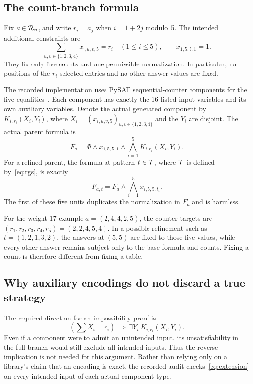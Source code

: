 \subsection{The count-branch formula}
Fix $a\in\mathcal{R}_n$, and write $r_i=a_j$ when $i=1+2j$ modulo~5.
The intended additional constraints are
\begin{equation}\label{eq:cardinality}
\sum_{u,v\in\{1,2,3,4\}}x_{i,u,v,5}=r_i
\quad(1\leq i\leq5),\qquad x_{1,5,5,1}=1.
\end{equation}
They fix only five counts and one permissible normalization. In
particular, no positions of the $r_i$ selected entries and no other answer
values are fixed.

The recorded implementation uses PySAT sequential-counter components
for the five equalities~\cite{pysat}. Each component has exactly the
16 listed input variables and its own auxiliary variables. Denote the
actual generated component by $K_{i,r_i}(X_i,Y_i)$, where
$X_i=(x_{i,u,v,5})_{u,v\in\{1,2,3,4\}}$ and the $Y_i$ are disjoint.
The actual parent formula is
\begin{equation}\label{eq:parent}
F_a=\Phi\land x_{1,5,5,1}\land\bigwedge_{i=1}^5K_{i,r_i}(X_i,Y_i).
\end{equation}
For a refined parent, the formula at pattern $t\in\mathcal{T}$, where $\mathcal{T}$
is defined by~\eqref{eq:rgs}, is exactly
\begin{equation}\label{eq:child}
F_{a,t}=F_a\land\bigwedge_{i=1}^5x_{i,5,5,t_i}.
\end{equation}
The first of these five units duplicates the normalization in $F_a$ and
is harmless.

For the weight-17 example $a=(2,4,4,2,5)$, the counter targets are
$(r_1,r_2,r_3,r_4,r_5)=(2,2,4,5,4)$. In a possible refinement such as
$t=(1,2,1,3,2)$, the answers at $(5,5)$ are fixed to those five values,
while every other answer remains subject only to the base formula and
counts. Fixing a count is therefore different from fixing a table.

\subsection{Why auxiliary encodings do not discard a true strategy}
The required direction for an impossibility proof is
\begin{equation}\label{eq:extension}
\left(\sum X_i=r_i\right)
\ \Longrightarrow\ \exists Y_i\ K_{i,r_i}(X_i,Y_i).
\end{equation}
Even if a component were to admit an unintended input, its
unsatisfiability in the full branch would still exclude all intended
inputs. Thus the reverse implication is not needed for this argument.
Rather than relying only on a library's claim that an encoding is exact,
the recorded audit checks~\eqref{eq:extension} on every intended input of
each actual component type.

